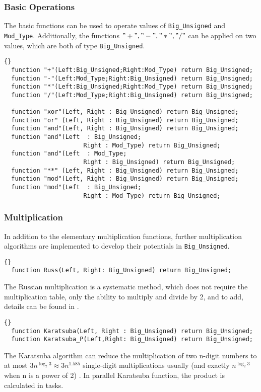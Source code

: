\subsubsection*{Basic Operations}
The basic functions can be used to operate values of
\texttt{Big\_Unsigned} and \texttt{Mod\_Type}. Additionally, the
functions $"+","-","*","/"$ can be applied on two values, which are
both of type \texttt{Big\_Unsigned}.

\begin{lstlisting}{}
  function "+"(Left:Big_Unsigned;Right:Mod_Type) return Big_Unsigned;
  function "-"(Left:Mod_Type;Right:Big_Unsigned) return Big_Unsigned;
  function "*"(Left:Big_Unsigned;Right:Mod_Type) return Big_Unsigned;
  function "/"(Left:Mod_Type;Right:Big_Unsigned) return Big_Unsigned;

  function "xor"(Left, Right : Big_Unsigned) return Big_Unsigned;
  function "or" (Left, Right : Big_Unsigned) return Big_Unsigned;
  function "and"(Left, Right : Big_Unsigned) return Big_Unsigned;
  function "and"(Left  : Big_Unsigned;
  					  Right : Mod_Type) return Big_Unsigned;
  function "and"(Left  : Mod_Type;
  					  Right : Big_Unsigned) return Big_Unsigned;
  function "**" (Left, Right : Big_Unsigned) return Big_Unsigned;
  function "mod"(Left, Right : Big_Unsigned) return Big_Unsigned;
  function "mod"(Left  : Big_Unsigned;
  					  Right : Mod_Type) return Big_Unsigned;
\end{lstlisting}


\subsubsection*{Multiplication}
In addition to the elementary multiplication functions, further
multiplication algorithms are implemented to develop their potentials
in \texttt{Big\_Unsigned}.\\

\begin{lstlisting}{}
  function Russ(Left, Right: Big_Unsigned) return Big_Unsigned;
\end{lstlisting}
The Russian multiplication is a systematic method, which does not
require the multiplication table, only the ability to multiply and
divide by 2, and to add, details can be found in \cite{Russ}.

\hhline

\begin{lstlisting}{}
  function Karatsuba(Left, Right : Big_Unsigned) return Big_Unsigned;
  function Karatsuba_P(Left,Right: Big_Unsigned) return Big_Unsigned;
\end{lstlisting}
The Karatsuba algorithm can reduce the multiplication of two n-digit
numbers to at most $3 n^{\log_2 3}\approx 3 n^{1.585}$ single-digit
multiplications usually (and exactly $n^{\log_2 3}$ when n is a power
of 2) \cite{DBLP:reference/crypt/2011}. In parallel Karatsuba
function, the product is calculated in tasks.

